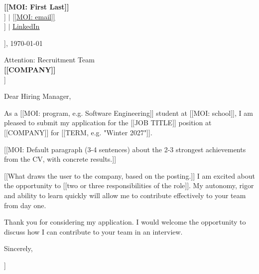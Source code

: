 \documentclass[letterpaper,11pt]{article}
\begin{document}
\begin{flushleft}
    \textbf{\Large [[MOI: First Last]]} \\
    [[MOI: phone]] $|$ \href{mailto:[[MOI: email]]}{[[MOI: email]]} \\
    [[MOI: City, QC]] $|$ \href{[[MOI: LinkedIn URL]]}{\underline{LinkedIn}}
\end{flushleft}

\vspace{20pt}

\begin{flushright}
    [[MOI: City]], \today
\end{flushright}

\vspace{10pt}

\begin{flushleft}
    Attention: Recruitment Team \\
    \textbf{[[COMPANY]]} \\
    [[CITY, PROVINCE]]
\end{flushleft}

\vspace{20pt}

Dear Hiring Manager,

\vspace{10pt}

As a [[MOI: program, e.g. Software Engineering]] student at [[MOI: school]], I am pleased to submit my application for the [[JOB TITLE]] position at [[COMPANY]] for [[TERM, e.g. "Winter 2027"]].

\vspace{10pt}

[[MOI: Default paragraph (3-4 sentences) about the 2-3 strongest achievements from the CV, with concrete results.]]

\vspace{10pt}

[[What draws the user to the company, based on the posting.]] I am excited about the opportunity to [[two or three responsibilities of the role]]. My autonomy, rigor and ability to learn quickly will allow me to contribute effectively to your team from day one.

\vspace{10pt}

Thank you for considering my application. I would welcome the opportunity to discuss how I can contribute to your team in an interview.

\vspace{20pt}

Sincerely,

\vspace{30pt}

\noindent [[MOI: First Last]]
\end{document}

